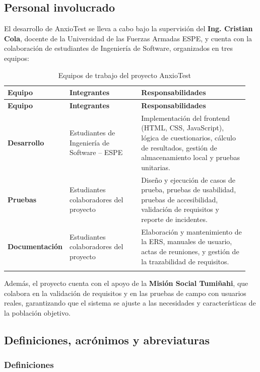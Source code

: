 \subsection{Personal involucrado}
\label{sec:personal_involucrado}

El desarrollo de AnxioTest se lleva a cabo bajo la supervisión del \textbf{Ing. Cristian Cola}, docente de la Universidad de las Fuerzas Armadas ESPE, y cuenta con la colaboración de estudiantes de Ingeniería de Software, organizados en tres equipos:

\begin{longtable}{p{0.20\linewidth} p{0.30\linewidth} p{0.45\linewidth}}
\toprule
\rowcolor{tableheader!20}
\textbf{Equipo} & \textbf{Integrantes} & \textbf{Responsabilidades} \\
\midrule
\endfirsthead
\rowcolor{tableheader!20}
\textbf{Equipo} & \textbf{Integrantes} & \textbf{Responsabilidades} \\
\midrule
\endhead
\bottomrule
\endfoot
\textbf{Desarrollo} & Estudiantes de Ingeniería de Software – ESPE & Implementación del frontend (HTML, CSS, JavaScript), lógica de cuestionarios, cálculo de resultados, gestión de almacenamiento local y pruebas unitarias. \\
\textbf{Pruebas} & Estudiantes colaboradores del proyecto & Diseño y ejecución de casos de prueba, pruebas de usabilidad, pruebas de accesibilidad, validación de requisitos y reporte de incidentes. \\
\textbf{Documentación} & Estudiantes colaboradores del proyecto & Elaboración y mantenimiento de la ERS, manuales de usuario, actas de reuniones, y gestión de la trazabilidad de requisitos. \\
\bottomrule
\caption{Equipos de trabajo del proyecto AnxioTest}
\label{tab:equipos}
\end{longtable}

Además, el proyecto cuenta con el apoyo de la \textbf{Misión Social Tumiñahi}, que colabora en la validación de requisitos y en las pruebas de campo con usuarios reales, garantizando que el sistema se ajuste a las necesidades y características de la población objetivo.

\subsection{Definiciones, acrónimos y abreviaturas}
\label{sec:definiciones}

\subsubsection{Definiciones}


